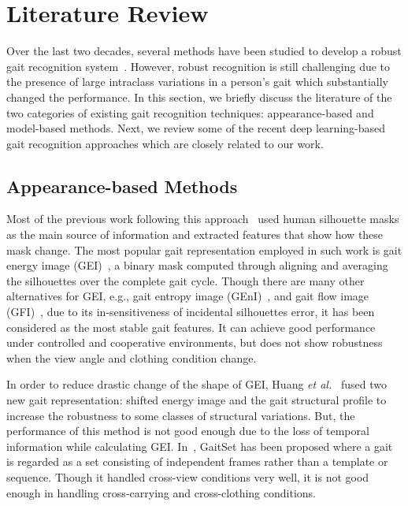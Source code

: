 \chapter{Literature Review} \label{literature_review}
Over the last two decades, several methods have been studied to develop a robust gait recognition system~\cite{Rida_19}. However, robust recognition is still challenging due to the presence of large intraclass variations in a person's gait which substantially changed the performance. In this section, we briefly discuss the literature of the two categories of existing gait recognition techniques: appearance-based and model-based methods. Next, we review some of the recent deep learning-based gait recognition approaches which are closely related to our work. 

\section{Appearance-based Methods}
Most of the previous work following this approach~\cite{Han_06, Bashir_09, Lam_11} used human silhouette masks as the main source of information and extracted features that show how these mask change. The most popular gait representation employed in such work is gait energy image (GEI)~\cite{Han_06}, a binary mask computed through aligning and averaging the silhouettes over the complete gait cycle. Though there are many other alternatives for GEI, e.g., gait entropy image (GEnI)~\cite{Bashir_09}, and gait flow image (GFI)~\cite{Lam_11}, due to its in-sensitiveness of incidental silhouettes error, it has been considered as the most stable gait features.  It can achieve good performance under controlled and cooperative environments, but does not show robustness when the view angle and clothing condition change. 

In order to reduce drastic change of the shape of GEI, Huang \textit{et al.}~\cite{Huang_12} fused two new gait representation: shifted energy image and the gait structural profile to increase the robustness to some classes of structural variations. But, the performance of this method is not good enough due to the loss of temporal information while calculating GEI. In~\cite{Chao_19}, GaitSet has been proposed where a gait is regarded as a set consisting of independent frames rather than a template or sequence. Though it handled cross-view conditions very well, it is not good enough in handling cross-carrying and cross-clothing conditions. 


